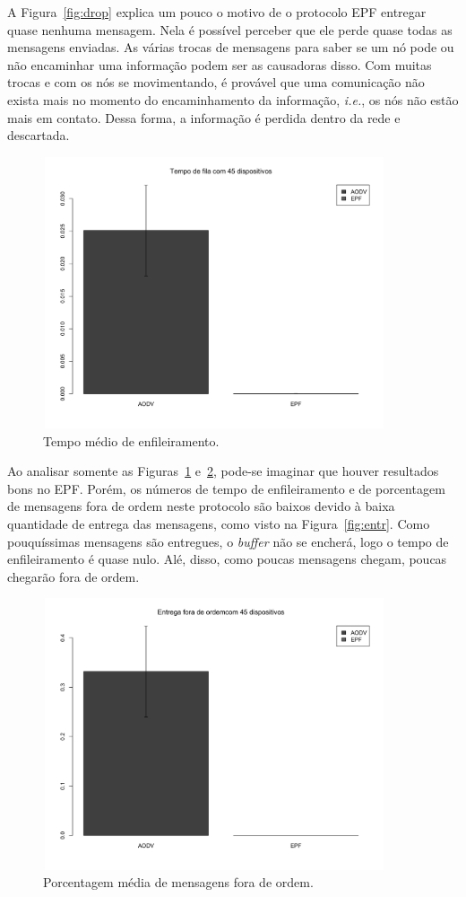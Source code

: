 \documentclass[11pt,a4paper,titlepage]{article}
\begin{document}
A Figura~\ref{fig:drop} explica um pouco o motivo de o protocolo EPF entregar quase nenhuma mensagem.
Nela é possível perceber que ele perde quase todas as mensagens enviadas.
As várias trocas de mensagens para saber se um nó pode ou não encaminhar uma informação podem ser as causadoras disso.
Com muitas trocas e com os nós se movimentando, é provável que uma comunicação não exista mais no momento do encaminhamento da informação, \textit{i.e.}, os nós não estão mais em contato.
Dessa forma, a informação é perdida dentro da rede e descartada.

\begin{figure}[ht]
\centering
\includegraphics[height=8cm, width=0.9\textwidth]{images/queue.jpg}
\caption{Tempo médio de enfileiramento.}
\label{fig:queue}
\end{figure}

Ao analisar somente as Figuras~\ref{fig:queue} e~\ref{fig:out}, pode-se imaginar que houver resultados bons no EPF.
Porém, os números de tempo de enfileiramento e de porcentagem de mensagens fora de ordem neste protocolo são baixos devido à baixa quantidade de entrega das mensagens, como visto na Figura~\ref{fig:entr}.
Como pouquíssimas mensagens são entregues, o \textit{buffer} não se encherá, logo o tempo de enfileiramento é quase nulo.
Alé, disso, como poucas mensagens chegam, poucas chegarão fora de ordem.

\begin{figure}[ht]
\centering
\includegraphics[height=8cm, width=0.9\textwidth]{images/out.jpg}
\caption{Porcentagem média de mensagens fora de ordem.}
\label{fig:out}
\end{figure}
\end{document}
